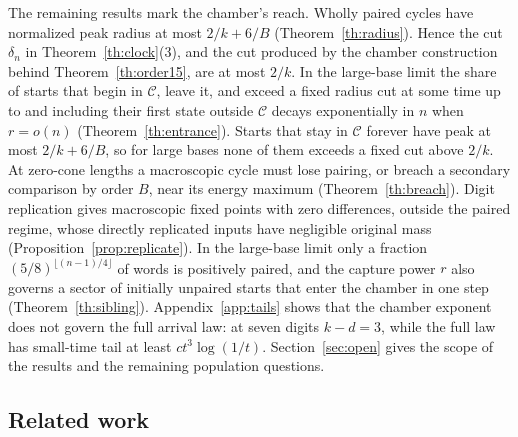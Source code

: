\documentclass[11pt]{amsart}
\theoremstyle{definition}
\newcommand{\C}{\mathcal C}
\begin{document}
The remaining results mark the chamber's reach. Wholly paired cycles
have normalized peak radius at most \(2/k+6/B\)
(Theorem~\ref{th:radius}). Hence the cut \(\delta_n\) in
Theorem~\ref{th:clock}(3), and the cut produced by the chamber
construction behind Theorem~\ref{th:order15}, are at most \(2/k\).
In the large-base limit the share of starts that begin in \(\C\), leave
it, and exceed a fixed radius cut at some time up to and including their
first state outside \(\C\) decays exponentially in \(n\) when
\(r=o(n)\) (Theorem~\ref{th:entrance}). Starts that stay in \(\C\)
forever have peak at most \(2/k+6/B\), so for large bases none of them
exceeds a fixed cut above \(2/k\). At zero-cone lengths a macroscopic cycle
must lose pairing, or breach a secondary comparison by order \(B\), near
its energy maximum (Theorem~\ref{th:breach}). Digit replication gives
macroscopic fixed points with zero differences, outside the paired
regime, whose directly replicated inputs have negligible original mass
(Proposition~\ref{prop:replicate}). In the large-base limit only a
fraction \((5/8)^{\lfloor(n-1)/4\rfloor}\) of words is positively paired,
and the capture power \(r\) also governs a sector of initially unpaired
starts that enter the chamber in one step (Theorem~\ref{th:sibling}).
Appendix~\ref{app:tails} shows that the chamber exponent does not govern
the full arrival law: at seven digits \(k-d=3\), while the full law has
small-time tail at least \(ct^3\log(1/t)\).
Section~\ref{sec:open} gives the scope of the results and the remaining
population questions.

\subsection*{Related work}
\end{document}
